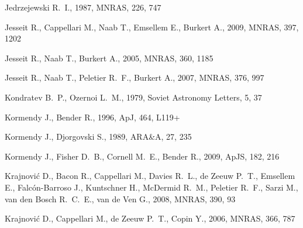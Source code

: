 \documentclass[usenatbib,usegraphicx]{mn2e}
\def\araa{ARA\&A}       %
\def\apjl{ApJ}          %
\def\apjs{ApJS}         %
\def\mnras{MNRAS}       %
\begin{document}
\begin{thebibliography}{}
{Jedrzejewski} R.~I.,  1987, \mnras, 226, 747

{Jesseit} R.,  {Cappellari} M.,  {Naab} T.,  {Emsellem} E.,    {Burkert} A.,
  2009, \mnras, 397, 1202

{Jesseit} R.,  {Naab} T.,    {Burkert} A.,  2005, \mnras, 360, 1185

{Jesseit} R.,  {Naab} T.,  {Peletier} R.~F.,    {Burkert} A.,  2007, \mnras,
  376, 997

{Kondratev} B.~P.,  {Ozernoi} L.~M.,  1979, Soviet Astronomy Letters, 5, 37

{Kormendy} J.,  {Bender} R.,  1996, \apjl, 464, L119+

{Kormendy} J.,  {Djorgovski} S.,  1989, \araa, 27, 235

{Kormendy} J.,  {Fisher} D.~B.,  {Cornell} M.~E.,    {Bender} R.,  2009, \apjs,
  182, 216

{Krajnovi{\'c}} D.,  {Bacon} R.,  {Cappellari} M.,  {Davies} R.~L.,  {de Zeeuw}
  P.~T.,  {Emsellem} E.,  {Falc{\'o}n-Barroso} J.,  {Kuntschner} H.,
  {McDermid} R.~M.,  {Peletier} R.~F.,  {Sarzi} M.,  {van den Bosch} R.~C.~E.,
    {van de Ven} G.,  2008, \mnras, 390, 93

{Krajnovi{\'c}} D.,  {Cappellari} M.,  {de Zeeuw} P.~T.,    {Copin} Y.,  2006,
  \mnras, 366, 787


\end{thebibliography}
\end{document}
